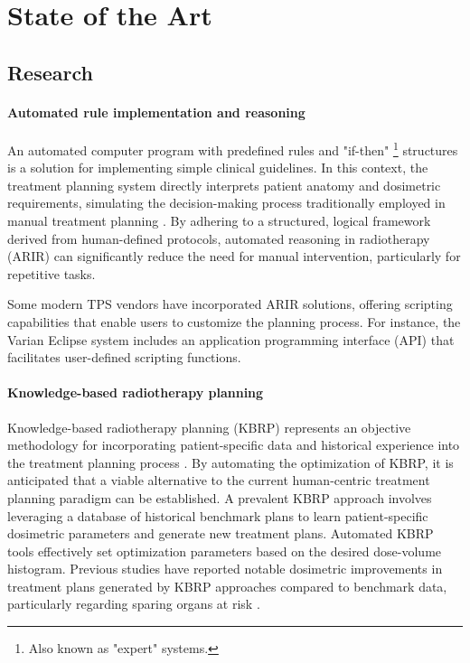 \section{State of the Art}
\subsection{Research}
\paragraph{Automated rule implementation and reasoning}
An automated computer program with predefined rules and "if-then" \footnote{Also known as "expert" systems.} structures is a solution for implementing simple clinical guidelines.
In this context, the treatment planning system directly interprets patient anatomy and dosimetric requirements, simulating the decision-making process traditionally employed in manual treatment planning \cite{Rossille2005}.
By adhering to a structured, logical framework derived from human-defined protocols, automated reasoning in radiotherapy (ARIR) can significantly reduce the need for manual intervention, particularly for repetitive tasks.

Some modern TPS vendors have incorporated ARIR solutions, offering scripting capabilities that enable users to customize the planning process.
For instance, the Varian Eclipse \cite{eclipse} system includes an application programming interface (API) that facilitates user-defined scripting functions.

\paragraph{Knowledge-based radiotherapy planning}
Knowledge-based radiotherapy planning (KBRP) represents an objective methodology for incorporating patient-specific data and historical experience into the treatment planning process \cite{Nwankwo_2014}.
By automating the optimization of KBRP, it is anticipated that a viable alternative to the current human-centric treatment planning paradigm can be established.
A prevalent KBRP approach involves leveraging a database of historical benchmark plans to learn patient-specific dosimetric parameters and generate new treatment plans.
Automated KBRP tools effectively set optimization parameters based on the desired dose-volume histogram.
Previous studies have reported notable dosimetric improvements in treatment plans generated by KBRP approaches compared to benchmark data, particularly regarding sparing organs at risk \cite{Fogliata2014,Tol2015}.

